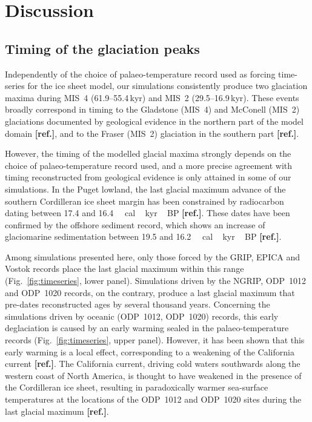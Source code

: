 \documentclass[tc, manuscript]{copernicus}
\newcommand{\aref}[0]{\textbf{[ref.]}}
\begin{document}
\section{Discussion}
\label{sec:discussion}

\subsection{Timing of the glaciation peaks}

Independently of the choice of palaeo-temperature record used as forcing
time-series for the ice sheet model, our simulations consistently produce two
glaciation maxima during MIS~4 (61.9--55.4\,kyr) and MIS~2
(29.5--16.9\,kyr). These events broadly correspond in timing to the
Gladstone (MIS~4) and McConell (MIS~2) glaciations documented by geological
evidence in the northern part of the model domain \aref, and to the Fraser
(MIS~2) glaciation in the southern part \aref.

However, the timing of the modelled glacial maxima strongly depends on the
choice of palaeo-temperature record used, and a more precise agreement with
timing reconstructed from geological evidence is only attained in some of our
simulations. In the Puget lowland, the last glacial maximum advance of the
southern Cordilleran ice sheet margin has been constrained by radiocarbon
dating between 17.4 and 16.4\,\unit{\,cal\,kyr\,BP} \aref.
These dates have been confirmed by the offshore sediment record, which shows an
increase of glaciomarine sedimentation between 19.5 and
16.2\,\unit{\,cal\,kyr\,BP} \aref.

Among simulations presented here, only those forced by the GRIP, EPICA and
Vostok records place the last glacial maximum within this range
(Fig.~\ref{fig:timeseries}, lower panel). Simulations driven by the NGRIP,
ODP~1012 and ODP~1020 records, on the contrary, produce a last glacial maximum
that pre-dates reconstructed ages by several thousand years. Concerning the
simulations driven by oceanic (ODP~1012, ODP~1020) records, this early
deglaciation is caused by an early warming sealed in the palaeo-temperature records
(Fig.~\ref{fig:timeseries}, upper panel). However, it has been shown that this
early warming is a local effect, corresponding to a weakening of the California
current \aref. The California current, driving cold waters southwards
along the western coast of North America, is thought to have weakened in the
presence of the Cordilleran ice sheet, resulting in paradoxically warmer
sea-surface temperatures at the locations of the ODP~1012 and ODP~1020 sites
during the last glacial maximum \aref.
\end{document}
